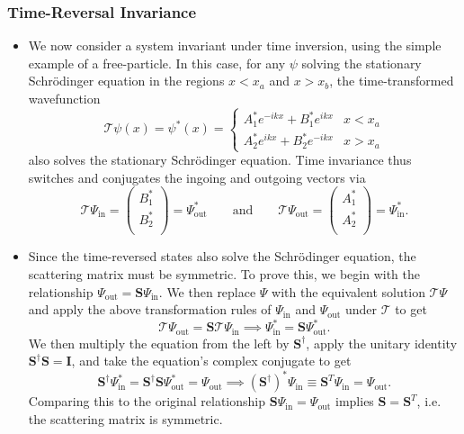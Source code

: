 \documentclass[11pt, a4paper]{article}
\newcommand{\Schro}{Schr\"{o}dinger\xspace}
\newcommand{\mat}[1]{\mathbf{#1}}  %
\renewcommand{\SS}{\mat{S}}  %
\newcommand{\T}{\mathcal{T}}  %
\renewcommand{\P}{\Psi}  %
\begin{document}
\subsubsection{Time-Reversal Invariance}
\begin{itemize}
    \item We now consider a system invariant under time inversion, using the simple example of a free-particle. In this case, for any $ \psi $ solving the stationary \Schro equation in the regions $ x < x_{a} $ and $ x > x_{b} $, the time-transformed wavefunction
    \begin{equation*}
        \T \psi(x) = \psi^{*}(x) = 
        \begin{cases}
            A^{*}_{1} e^{-ikx} + B^{*}_{1} e^{ikx} & x < x_{a}\\
            A^{*}_{2} e^{ikx} + B^{*}_{2} e^{-ikx} & x > x_{a}
        \end{cases}
    \end{equation*}
    also solves the stationary \Schro equation. Time invariance thus switches and conjugates the ingoing and outgoing vectors via
    \begin{equation*}
        \T \Psi_{\text{in}} = 
        \begin{pmatrix}
            B_{1}^{*}\\
            B_{2}^{*}\\
        \end{pmatrix}
        = \Psi^{*}_{\text{out}}
        \qquad \text{and} \qquad 
        \T \Psi_{\text{out}} = 
        \begin{pmatrix}
            A_{1}^{*}\\
            A_{2}^{*}\\
        \end{pmatrix}
        = \Psi^{*}_{\text{in}}.
    \end{equation*}

    \item Since the time-reversed states also solve the \Schro equation, the scattering matrix must be symmetric. To prove this, we begin with the relationship $ \Psi_{\text{out}} = \SS \Psi_{\text{in}} $. We then replace $ \Psi $ with the equivalent solution $ \T \Psi $ and apply the above transformation rules of $ \P_{\text{in}} $ and $ \Psi_{\text{out}} $ under $ \T $ to get
    \begin{equation*}
        \T \Psi_{\text{out}} = \SS \T \Psi_{\text{in}} \implies \Psi_{\text{in}}^{*} = \SS \Psi_{\text{out}}^{*}.
    \end{equation*}
    We then multiply the equation from the left by $ \SS^{\dagger} $, apply the unitary identity $ \SS^{\dagger}\SS = \mat{I} $, and take the equation's complex conjugate to get
    \begin{equation*}
        \SS^{\dagger}\Psi_{\text{in}}^{*} = \SS^{\dagger}\SS \Psi_{\text{out}}^{*} = \Psi_{\text{out}} \implies (\SS^{\dagger})^{*} \Psi_{\text{in}} \equiv \SS^{T}\Psi_{\text{in}} = \Psi_{\text{out}}.
    \end{equation*}
    Comparing this to the original relationship $ \SS \Psi_{\text{in}} = \Psi_{\text{out}} $ implies $ \SS = \SS^{T} $, i.e. the scattering matrix is symmetric.


\end{itemize}
\end{document}
